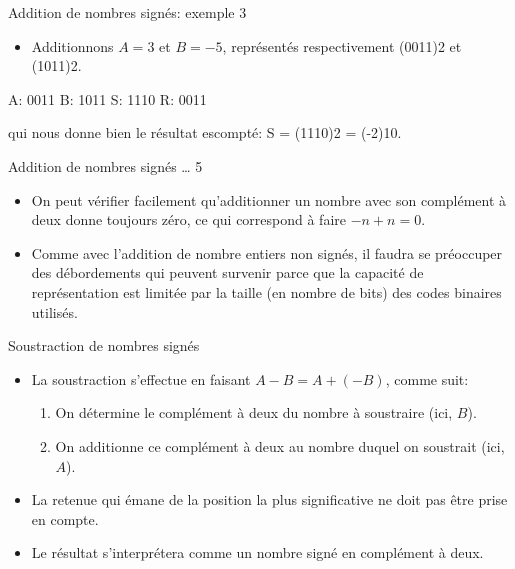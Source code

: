 \documentclass[presentation]{beamer}
\begin{document}
\begin{frame}[label={sec:orgfead533}]{Addition de nombres signés: exemple 3}
\begin{itemize}
\item Additionnons \(A=3\) et \(B=-5\), représentés respectivement (0011)2 et (1011)2.
\end{itemize}

A: 0011
B: 1011
S: 1110
R: 0011

qui nous donne bien le résultat escompté: S = (1110)2 = (-2)10.
\end{frame}

\begin{frame}[label={sec:orgc91e2ed}]{Addition de nombres signés \ldots{} 5}
\begin{itemize}
\item On peut vérifier facilement qu'additionner un nombre avec son complément à deux donne toujours zéro, ce qui correspond à faire \(-n + n = 0\).

\item Comme avec l'addition de nombre entiers non signés, il faudra se préoccuper des débordements qui peuvent survenir parce que la capacité de représentation est limitée par la taille (en nombre de bits) des codes binaires utilisés.
\end{itemize}
\end{frame}

\begin{frame}[label={sec:orgd187f18}]{Soustraction de nombres signés}
\begin{itemize}
\item La soustraction s'effectue en faisant \(A - B = A + (-B)\), comme suit:

\begin{enumerate}
\item On détermine le complément à deux du nombre à soustraire (ici, \(B\)).
\item On additionne ce complément à deux au nombre duquel on soustrait  (ici, \(A\)).
\end{enumerate}

\item La retenue qui émane de la position la plus significative ne doit pas être prise en compte.

\item Le résultat s'interprétera comme un nombre signé en complément à deux.
\end{itemize}
\end{frame}
\end{document}
